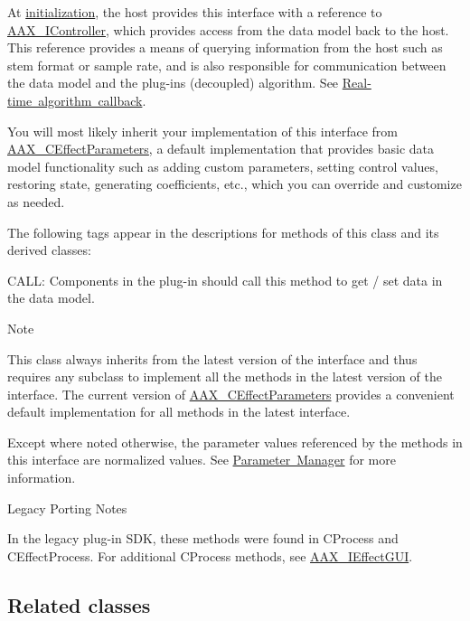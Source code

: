 At \mbox{\hyperlink{a01669_ad4db3c0ab67f8f41cdd042a915daabb4}{initialization}}, the host provides this interface with a reference to \mbox{\hyperlink{a01789}{A\+A\+X\+\_\+\+I\+Controller}}, which provides access from the data model back to the host. This reference provides a means of querying information from the host such as stem format or sample rate, and is also responsible for communication between the data model and the plug-\/in\textquotesingle{}s (decoupled) algorithm. See \mbox{\hyperlink{a00797}{Real-\/time algorithm callback}}.

You will most likely inherit your implementation of this interface from \mbox{\hyperlink{a01481}{A\+A\+X\+\_\+\+C\+Effect\+Parameters}}, a default implementation that provides basic data model functionality such as adding custom parameters, setting control values, restoring state, generating coefficients, etc., which you can override and customize as needed.

The following tags appear in the descriptions for methods of this class and its derived classes\+: \begin{DoxyItemize}
\item {\ttfamily C\+A\+LL\+:} Components in the plug-\/in should call this method to get / set data in the data model.\end{DoxyItemize}
\begin{DoxyNote}{Note}
\begin{DoxyItemize}
\item This class always inherits from the latest version of the interface and thus requires any subclass to implement all the methods in the latest version of the interface. The current version of \mbox{\hyperlink{a01481}{A\+A\+X\+\_\+\+C\+Effect\+Parameters}} provides a convenient default implementation for all methods in the latest interface. \item Except where noted otherwise, the parameter values referenced by the methods in this interface are normalized values. See \mbox{\hyperlink{a00814}{Parameter Manager}} for more information.\end{DoxyItemize}

\end{DoxyNote}
\begin{DoxyRefDesc}{Legacy Porting Notes}
\item[\mbox{\hyperlink{a00787__porting_notes000038}{Legacy Porting Notes}}]In the legacy plug-\/in S\+DK, these methods were found in C\+Process and {\ttfamily C\+Effect\+Process}. For additional {\ttfamily C\+Process} methods, see \mbox{\hyperlink{a01821}{A\+A\+X\+\_\+\+I\+Effect\+G\+UI}}.\end{DoxyRefDesc}
\hypertarget{a01825_AAX_IEffectParameters_relclass}{}\subsection{Related classes}\label{a01825_AAX_IEffectParameters_relclass}

